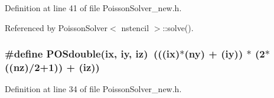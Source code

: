 Definition at line 41 of file PoissonSolver\_\-new.h.



Referenced by PoissonSolver$<$ nstencil $>$::solve().

\subsubsection[{POSdouble}]{\setlength{\rightskip}{0pt plus 5cm}\#define POSdouble(ix, \/  iy, \/  iz)~(((ix)$\ast$(ny) + (iy)) $\ast$ (2$\ast$((nz)/2+1)) + (iz))}\label{PoissonSolver__new_8h_a57c2f618d21bf58344c3d10ce4eb0425}


Definition at line 34 of file PoissonSolver\_\-new.h.

